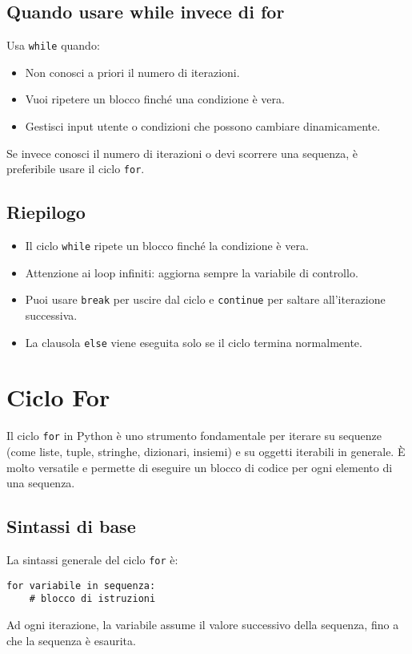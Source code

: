 \documentclass[a4paper,12pt]{article}
\begin{document}
\subsection*{Quando usare while invece di for}
Usa \texttt{while} quando:
\begin{itemize}
    \item Non conosci a priori il numero di iterazioni.
    \item Vuoi ripetere un blocco finché una condizione è vera.
    \item Gestisci input utente o condizioni che possono cambiare dinamicamente.
\end{itemize}
Se invece conosci il numero di iterazioni o devi scorrere una sequenza, è preferibile usare il ciclo \texttt{for}.

\subsection*{Riepilogo}
\begin{itemize}
    \item Il ciclo \texttt{while} ripete un blocco finché la condizione è vera.
    \item Attenzione ai loop infiniti: aggiorna sempre la variabile di controllo.
    \item Puoi usare \texttt{break} per uscire dal ciclo e \texttt{continue} per saltare all'iterazione successiva.
    \item La clausola \texttt{else} viene eseguita solo se il ciclo termina normalmente.
\end{itemize}

\begin{center}
\end{center}

\section{Ciclo For}
Il ciclo \texttt{for} in Python è uno strumento fondamentale per iterare su sequenze (come liste, tuple, stringhe, dizionari, insiemi) e su oggetti iterabili in generale. È molto versatile e permette di eseguire un blocco di codice per ogni elemento di una sequenza.

\subsection*{Sintassi di base}
La sintassi generale del ciclo \texttt{for} è:
\begin{lstlisting}
for variabile in sequenza:
    # blocco di istruzioni
\end{lstlisting}
Ad ogni iterazione, la variabile assume il valore successivo della sequenza, fino a che la sequenza è esaurita.
\end{document}
